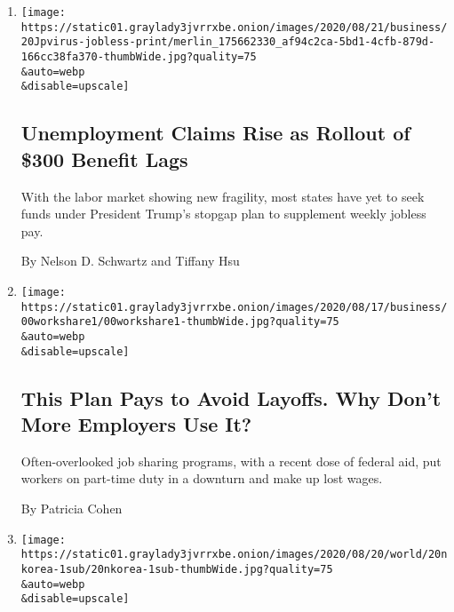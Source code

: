 \begin{enumerate}
\def\labelenumi{\arabic{enumi}.}
\item
  \href{/2020/08/20/business/economy/unemployment-claims.html}{}

  \texttt{[image: https://static01.graylady3jvrrxbe.onion/images/2020/08/21/business/20Jpvirus-jobless-print/merlin\_175662330\_af94c2ca-5bd1-4cfb-879d-166cc38fa370-thumbWide.jpg?quality=75\\\&auto=webp\\\&disable=upscale]}

  \hypertarget{unemployment-claims-rise-as-rollout-of-300-benefit-lags}{%
  \subsection{Unemployment Claims Rise as Rollout of \$300 Benefit
  Lags}\label{unemployment-claims-rise-as-rollout-of-300-benefit-lags}}

  With the labor market showing new fragility, most states have yet to
  seek funds under President Trump's stopgap plan to supplement weekly
  jobless pay.

  By Nelson D. Schwartz and Tiffany Hsu
\item
  \href{/2020/08/20/business/economy/jobs-work-sharing-unemployment.html}{}

  \texttt{[image: https://static01.graylady3jvrrxbe.onion/images/2020/08/17/business/00workshare1/00workshare1-thumbWide.jpg?quality=75\\\&auto=webp\\\&disable=upscale]}

  \hypertarget{this-plan-pays-to-avoid-layoffs-why-dont-more-employers-use-it}{%
  \subsection{This Plan Pays to Avoid Layoffs. Why Don't More Employers
  Use
  It?}\label{this-plan-pays-to-avoid-layoffs-why-dont-more-employers-use-it}}

  Often-overlooked job sharing programs, with a recent dose of federal
  aid, put workers on part-time duty in a downturn and make up lost
  wages.

  By Patricia Cohen
\item
  \href{/2020/08/19/world/asia/north-korea-economy-coronavirus.html}{}

  \texttt{[image: https://static01.graylady3jvrrxbe.onion/images/2020/08/20/world/20nkorea-1sub/20nkorea-1sub-thumbWide.jpg?quality=75\\\&auto=webp\\\&disable=upscale]}

  \hypertarget{north-koreas-leader-had-big-economic-plans-he-admits-theyve-failed}{%
}
\end{enumerate}
